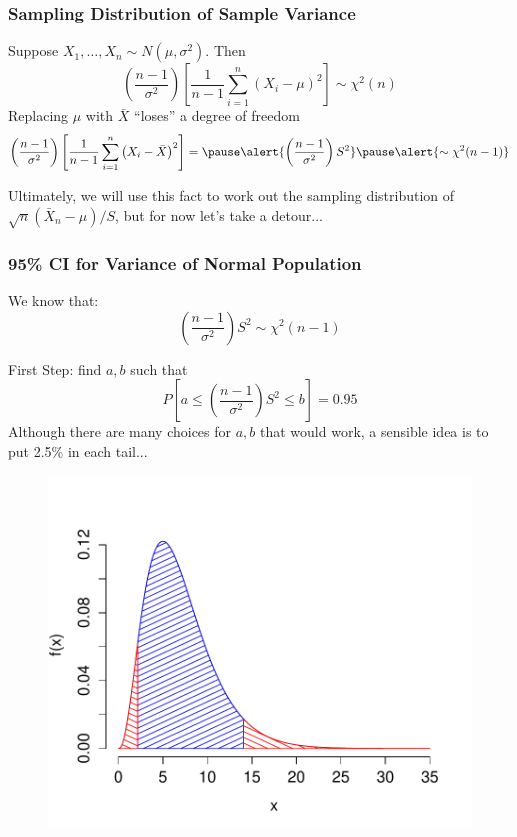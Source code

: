 \documentclass[handout]{beamer}
\begin{document}
\begin{frame}
\frametitle{Sampling Distribution of Sample Variance}
Suppose $X_1, \hdots, X_n \sim N(\mu,\sigma^2)$. Then
$$\left(\frac{n-1}{\sigma^2}\right) \left[\frac{1}{n-1}\sum_{i=1}^n \left(X_i - \mu\right)^2\right] \sim \chi^2(n)$$
\pause
Replacing $\mu$ with $\bar{X}$ ``loses'' a degree of freedom
	$$\left(\frac{n-1}{\sigma^2}\right) \left[\frac{1}{n-1}\sum_{i=1}^n \left(X_i - \bar{X}\right)^2\right] =\pause\alert{ \left(\frac{n-1}{\sigma^2}\right)S^2} \pause \alert{\sim \chi^2(n-1)}$$


\alert{Ultimately, we will use this fact to work out the sampling distribution of $\sqrt{n}(\bar{X}_n-\mu)/S$, but for now let's take a detour...}
\end{frame}
\begin{frame}
\frametitle{95\% CI for Variance of Normal Population}
We know that:
	$$\left( \frac{n-1}{\sigma^2}\right)S^2\sim \chi^2(n-1)$$
	\pause
	\vspace{2em}
	
First Step: find $a,b$ such that 
	$$P\left[ a\leq   \left( \frac{n-1}{\sigma^2}\right)S^2 \leq b \right] = 0.95$$
	\pause
\alert{Although there are many choices for $a,b$ that would work, a sensible idea is to put 2.5\% in each tail...}
\end{frame}
\begin{frame}
\begin{figure}
\centering
\includegraphics[scale = 0.65]{./images/chisq_tails}
\end{figure}
\end{frame}
\end{document}
